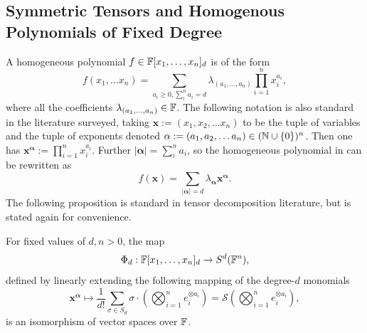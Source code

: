 \documentclass[../Lael_John_MasterThesis_Draft.tex]{subfiles}
\begin{document}
\subsection*{Symmetric Tensors and Homogenous Polynomials of Fixed Degree}\label{subsection:homogeneouspolyrelation}
A homogeneous polynomial $f \in \mathbb{F}[x_1, \ldots, x_n]_d$ is of the form \begin{equation}\label{eqn:hompolynomialexpandeddefn}
    f(x_1, \ldots x_n) = \sum_{a_i \geq 0, \sum_{i}^{n} a_i = d} \lambda_{(a_1, \ldots, a_n)}\prod_{i=1}^{n}x_i^{a_i},
\end{equation}
where all the coefficients $\lambda_{(a_1, \ldots, a_n)} \in \mathbb{F}$. The following notation is also standard in the literature surveyed, taking $\mathbf{x} := (x_1, x_2, \ldots x_n)$ to be the tuple of variables and the tuple of exponents denoted $\mathbf{\alpha}:= (a_1, a_2, \ldots a_n) \in (\mathbb{N} \cup \{0\})^n$. Then one has $\mathbf{x^{\alpha}} := \prod_{i=1}^{n}x_i^{a_i}$. Further $|\mathbf{\alpha}| = \sum_{i}^{n} a_i$, so the homogeneous polynomial in  can be rewritten as 
\begin{equation}\label{eqn:hompolynomialconddefn}
    f(\mathbf{x}) = \sum_{|\mathbf{\alpha}| = d} \lambda_{\mathbf{\alpha}}\mathbf{x^{\alpha}}.
\end{equation}
The following proposition is standard in tensor decomposition literature, but is stated again for convenience.
\begin{proposition}\label{prop:homotensorisomorphism}
    For fixed values of $d, n > 0$, the map $$\Phi_d: \mathbb{F}[x_1, \ldots, x_n]_d \to S^d(\mathbb{F}^n),$$ defined by linearly extending the following mapping of the degree-$d$ monomials
    \begin{equation}\label{eqn:hompolytosymtensormapping}
        \mathbf{x^{\alpha}} \mapsto \frac{1}{d!}\sum_{\sigma \in S_d} \sigma \cdot \left(\bigotimes_{i=1}^n e_i^{\otimes a_i}\right) = \mathcal{S}\left(\bigotimes_{i=1}^n e_i^{\otimes a_i}\right),
    \end{equation}
    is an isomorphism of vector spaces over $\mathbb{F}$.
\end{proposition}
\end{document}
